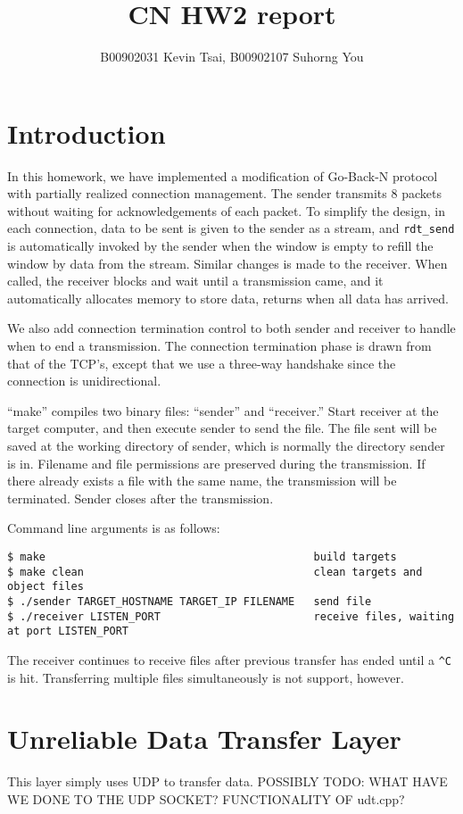 \documentclass[10pt,a4paper]{article}
\author{B00902031 Kevin Tsai, B00902107 Suhorng You}
\title{CN HW2 report}
\begin{document}
\maketitle

\section{Introduction}
    In this homework, we have implemented a modification of Go-Back-N protocol with partially realized connection management. The sender transmits $8$ packets without waiting for acknowledgements of each packet. To simplify the design, in each connection, data to be sent is given to the sender as a stream, and \texttt{rdt\_send} is automatically invoked by the sender when the window is empty to refill the window by data from the stream. Similar changes is made to the receiver. When called, the receiver blocks and wait until a transmission came, and it automatically allocates memory to store data, returns when all data has arrived.

    We also add connection termination control to both sender and receiver to handle when to end a transmission. The connection termination phase is drawn from that of the TCP's, except that we use a three-way handshake since the connection is unidirectional.

    ``make'' compiles two binary files: ``sender'' and ``receiver.'' Start receiver at the target computer, and then execute sender to send the file. The file sent will be saved at the working directory of sender, which is normally the directory sender is in. Filename and file permissions are preserved during the transmission. If there already exists a file with the same name, the transmission will be terminated. Sender closes after the transmission.

    Command line arguments is as follows:
\begin{verbatim}
$ make											build targets
$ make clean									clean targets and object files
$ ./sender TARGET_HOSTNAME TARGET_IP FILENAME	send file
$ ./receiver LISTEN_PORT						receive files, waiting at port LISTEN_PORT
\end{verbatim}

    The receiver continues to receive files after previous transfer has ended until a \texttt{\^{}C} is hit. Transferring multiple files simultaneously is not support, however.
\section{Unreliable Data Transfer Layer}
    This layer simply uses UDP to transfer data.
    POSSIBLY TODO: WHAT HAVE WE DONE TO THE UDP SOCKET? FUNCTIONALITY OF udt.cpp?
\end{document}
